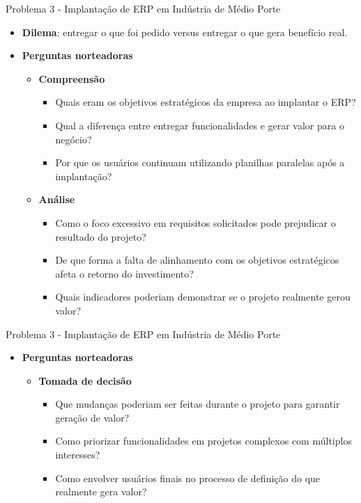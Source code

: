 \documentclass{beamer}
\begin{document}
\begin{frame}{Problema 3 - Implantação de ERP em Indústria de Médio Porte}
	\begin{itemize}
		\justifying
		\item \textbf{Dilema}: entregar o que foi pedido versus entregar o que gera benefício real.
		\item \textbf{Perguntas norteadoras}
		\begin{itemize}
			\item \textbf{Compreensão}
				\begin{itemize}
					\justifying
					\item Quais eram os objetivos estratégicos da empresa ao implantar o ERP?
					\item Qual a diferença entre entregar funcionalidades e gerar valor para o negócio?
					\item Por que os usuários continuam utilizando planilhas paralelas após a implantação?
				\end{itemize}
			\item \textbf{Análise}
				\begin{itemize}
					\justifying
					\item Como o foco excessivo em requisitos solicitados pode prejudicar o resultado do projeto?
					\item De que forma a falta de alinhamento com os objetivos estratégicos afeta o retorno do investimento?
					\item Quais indicadores poderiam demonstrar se o projeto realmente gerou valor?
				\end{itemize}
		\end{itemize}
	\end{itemize}
\end{frame}

\begin{frame}{Problema 3 - Implantação de ERP em Indústria de Médio Porte}
	\begin{itemize}
		\justifying
		\item \textbf{Perguntas norteadoras}
		\begin{itemize}
			\item \textbf{Tomada de decisão}
			\begin{itemize}
				\justifying
				\item Que mudanças poderiam ser feitas durante o projeto para garantir geração de valor?
				\item Como priorizar funcionalidades em projetos complexos com múltiplos interesses?
				\item Como envolver usuários finais no processo de definição do que realmente gera valor?
			\end{itemize}
		\end{itemize}
	\end{itemize}
\end{frame}
\end{document}
